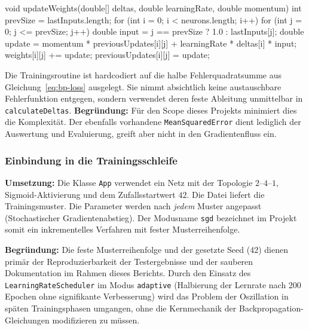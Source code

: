 \begin{javacode}[label={lst:bp-update}]{}
	void updateWeights(double[] deltas, double learningRate, double momentum) {
			int prevSize = lastInputs.length;
			for (int i = 0; i < neurons.length; i++) {
					for (int j = 0; j <= prevSize; j++) {
							double input = j == prevSize ? 1.0 : lastInputs[j];
							double update = momentum * previousUpdates[i][j] + learningRate * deltas[i] * input;
							weights[i][j] += update;
							previousUpdates[i][j] = update;
						}
				}
		}
\end{javacode}

Die Trainingsroutine ist hardcodiert auf die halbe Fehlerquadratsumme aus Gleichung~\eqref{eq:bp-loss} ausgelegt. Sie nimmt absichtlich keine austauschbare Fehlerfunktion entgegen, sondern verwendet deren feste Ableitung unmittelbar in \texttt{calculateDeltas}. \textbf{Begründung:} Für den Scope dieses Projekts minimiert dies die Komplexität. Der ebenfalls vorhandene \texttt{MeanSquaredError} dient lediglich der Auswertung und Evaluierung, greift aber nicht in den Gradientenfluss ein.

\subsubsection{Einbindung in die Trainingsschleife}


\textbf{Umsetzung:} Die Klasse \texttt{App} verwendet ein Netz mit der Topologie $2$--$4$--$1$, Sigmoid-Aktivierung und dem Zufallsstartwert $42$. Die Datei  liefert die Trainingsmuster. Die Parameter werden nach \emph{jedem} Muster angepasst (Stochastischer Gradientenabstieg). Der Modusname \texttt{sgd} bezeichnet im Projekt somit ein inkrementelles Verfahren mit fester Musterreihenfolge.


\textbf{Begründung:} Die feste Musterreihenfolge und der gesetzte Seed (42) dienen primär der Reproduzierbarkeit der Testergebnisse und der sauberen Dokumentation im Rahmen dieses Berichts. Durch den Einsatz des \texttt{LearningRateScheduler} im Modus \texttt{adaptive} (Halbierung der Lernrate nach 200 Epochen ohne signifikante Verbesserung) wird das Problem der Oszillation in späten Trainingsphasen umgangen, ohne die Kernmechanik der Backpropagation-Gleichungen modifizieren zu müssen.
